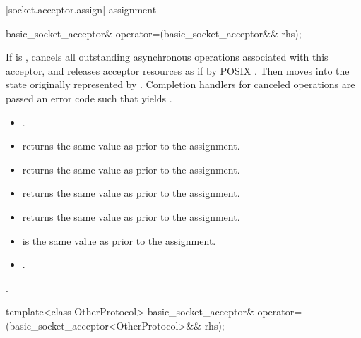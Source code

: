 [socket.acceptor.assign]{ assignment}

\begin{itemdecl}
basic_socket_acceptor& operator=(basic_socket_acceptor&& rhs);
\end{itemdecl}

\begin{itemdescr}
\pnum
\effects If  is , cancels all outstanding asynchronous operations associated with this acceptor, and releases acceptor resources as if by POSIX . Then moves into  the state originally represented by . Completion handlers for canceled operations are passed an error code  such that  yields .

\pnum
\postconditions 
\begin{itemize}
\item
{}.
\item
{} returns the same value as  prior to the assignment.
\item
{} returns the same value as  prior to the assignment.
\item
{} returns the same value as  prior to the assignment.
\item
{} returns the same value as  prior to the assignment.
\item
{} is the same value as  prior to the assignment.
\item
{}.
\end{itemize}

\pnum
\returns {}.
\end{itemdescr}

\begin{itemdecl}
template<class OtherProtocol>
  basic_socket_acceptor& operator=(basic_socket_acceptor<OtherProtocol>&& rhs);
\end{itemdecl}

